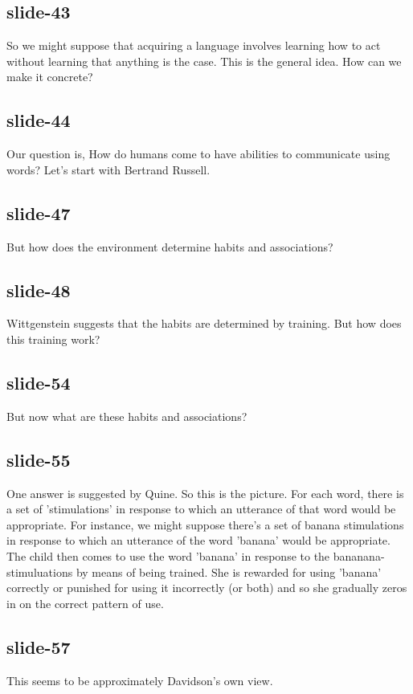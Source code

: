 \documentclass[12pt,\papersize]{extarticle}
\begin{document}
 
\subsection{slide-43}
So we might suppose that acquiring a language involves learning how to act without learning that anything is the case.
This is the general idea. How can we make it concrete?
 
 
\subsection{slide-44}
Our question is, How do humans come to have abilities to communicate using words?
Let's start with Bertrand Russell.
 
 
\subsection{slide-47}
But how does the environment determine habits and associations?
 
 
\subsection{slide-48}
Wittgenstein suggests that the habits are determined by training.
But how does this training work?
 
 
\subsection{slide-54}
But now what are these habits and associations?
 
 
\subsection{slide-55}
One answer is suggested by Quine.
So this is the picture.
For each word, there is a set of 'stimulations' in response to which an utterance of that word would be appropriate.
For instance, we might suppose there's a set of banana stimulations in response to which an utterance of the word 'banana' would be appropriate.
The child then comes to use the word 'banana' in response to the bananana-stimuluations by means of being trained.
She is rewarded for using 'banana' correctly or punished for using it incorrectly (or both) and so she gradually zeros in on the correct pattern of use.
 
 
\subsection{slide-57}
This seems to be approximately Davidson's own view.
 
\end{document}
